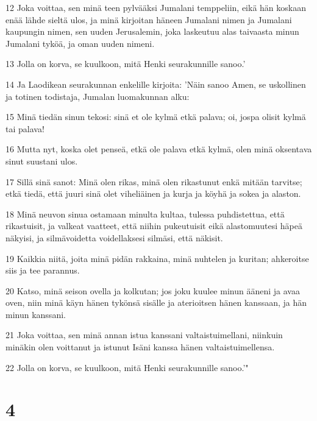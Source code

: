 \par 12 Joka voittaa, sen minä teen pylvääksi Jumalani temppeliin, eikä hän koskaan enää lähde sieltä ulos, ja minä kirjoitan häneen Jumalani nimen ja Jumalani kaupungin nimen, sen uuden Jerusalemin, joka laskeutuu alas taivaasta minun Jumalani tyköä, ja oman uuden nimeni.
\par 13 Jolla on korva, se kuulkoon, mitä Henki seurakunnille sanoo.'
\par 14 Ja Laodikean seurakunnan enkelille kirjoita: 'Näin sanoo Amen, se uskollinen ja totinen todistaja, Jumalan luomakunnan alku:
\par 15 Minä tiedän sinun tekosi: sinä et ole kylmä etkä palava; oi, jospa olisit kylmä tai palava!
\par 16 Mutta nyt, koska olet penseä, etkä ole palava etkä kylmä, olen minä oksentava sinut suustani ulos.
\par 17 Sillä sinä sanot: Minä olen rikas, minä olen rikastunut enkä mitään tarvitse; etkä tiedä, että juuri sinä olet viheliäinen ja kurja ja köyhä ja sokea ja alaston.
\par 18 Minä neuvon sinua ostamaan minulta kultaa, tulessa puhdistettua, että rikastuisit, ja valkeat vaatteet, että niihin pukeutuisit eikä alastomuutesi häpeä näkyisi, ja silmävoidetta voidellaksesi silmäsi, että näkisit.
\par 19 Kaikkia niitä, joita minä pidän rakkaina, minä nuhtelen ja kuritan; ahkeroitse siis ja tee parannus.
\par 20 Katso, minä seison ovella ja kolkutan; jos joku kuulee minun ääneni ja avaa oven, niin minä käyn hänen tykönsä sisälle ja aterioitsen hänen kanssaan, ja hän minun kanssani.
\par 21 Joka voittaa, sen minä annan istua kanssani valtaistuimellani, niinkuin minäkin olen voittanut ja istunut Isäni kanssa hänen valtaistuimellensa.
\par 22 Jolla on korva, se kuulkoon, mitä Henki seurakunnille sanoo.'"

\chapter{4}

